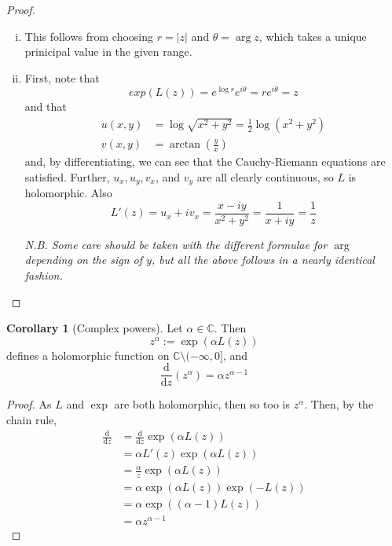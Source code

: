 \documentclass[10pt,fleqn]{article}
\newcommand{\comps}{\mathbb{C}}
\theoremstyle{definition} \newtheorem{defn}{Definition}[section]
\theoremstyle{plain}      \newtheorem{thm}[defn]{Theorem}
\theoremstyle{definition} \newtheorem{prop}[defn]{Proposition}
\theoremstyle{plain}      \newtheorem{lem}[defn]{Lemma}
\theoremstyle{definition} \newtheorem{cor}[defn]{Corollary}
\theoremstyle{definition} \newtheorem{ex}[defn]{Example}
\theoremstyle{definition} \newtheorem{rem}[defn]{Remark}
\begin{document}
\begin{proof}
    \begin{enumerate}[(i)]
        \item This follows from choosing $r=|z|$ and $\theta=\arg z$, which takes a unique prinicipal value in the given range.
        \item First, note that
        \[
            exp(L(z))=
            e^{\log r}e^{i\theta}=
            re^{i\theta}=
            z
        \]
        and that
        \begin{align*}
            u(x,y)
            &=
            \log\sqrt{x^2+y^2}
            =
            \frac{1}{2}\log(x^2+y^2)\\
            v(x,y)
            &=
            \arctan(\frac{y}{x})
        \end{align*}
        and, by differentiating, we can see that the Cauchy-Riemann equations are satisfied.
        Further, $u_x,u_y,v_x$, and $v_y$ are all clearly continuous, so $L$ is holomorphic.
        Also
        \[
            L'(z)=
            u_x+iv_x=
            \frac{x-iy}{x^2+y^2}=
            \frac{1}{x+iy}=
            \frac{1}{z}
        \]

        \emph{N.B. Some care should be taken with the different formulae for $\arg$ depending on the sign of $y$, but all the above follows in a nearly identical fashion.}
    \end{enumerate}
\end{proof}

\begin{cor}[Complex powers]
    Let $\alpha\in\comps$.
    Then
    \begin{equation}
        z^{\alpha}:=
        \exp(\alpha L(z))
    \end{equation}
    defines a holomorphic function on $\comps\setminus(-\infty,0]$, and
    \[
        \frac{\mathrm{d}}{\mathrm{d}z}(z^{\alpha})=
        \alpha z^{\alpha-1}
    \]
\end{cor}

\begin{proof}
    As $L$ and $\exp$ are both holomorphic, then so too is $z^{\alpha}$.
    Then, by the chain rule,
    \begin{align*}
        \frac{\mathrm{d}}{\mathrm{d}z}
        &=
        \frac{\mathrm{d}}{\mathrm{d}z}\exp(\alpha L(z))\\
        &=
        \alpha L'(z)\exp(\alpha L(z))\\
        &=
        \frac{\alpha}{z}\exp(\alpha L(z))\\
        &=
        \alpha\exp(\alpha L(z))\exp(-L(z))\\
        &=
        \alpha\exp((\alpha-1)L(z))\\
        &=
        \alpha z^{\alpha-1}
    \end{align*}
\end{proof}
\end{document}
